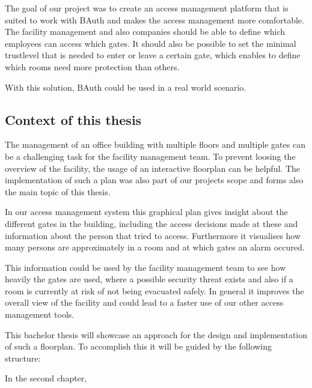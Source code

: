 
The goal of our project was to create an access management platform that is suited to work with BAuth and makes the access management more comfortable. The facility management and also companies should be able to define which employees can access which gates. It should also be possible to set the minimal trustlevel that is needed to enter or leave a certain gate, which enables to define which rooms need more protection than others.

With this solution, BAuth could be used in a real world scenario.

\subsection{Context of this thesis}
\label{Context of this thesis}


The management of an office building with multiple floors and multiple gates can be a challenging task for the facility management team. To prevent loosing the overview of the facility, the usage of an interactive floorplan can be helpful. The implementation of such a plan was also part of our projects scope and forms also the main topic of this thesis.

In our access management system this graphical plan gives insight about the different gates in the building, including the access decisions made at these and information about the person that tried to access. Furthermore it visualises how many persons are approximately in a room and at which gates an alarm occured. 

This information could be used by the facility management team to see how heavily the gates are used, where a possible security threat exists and also if a room is currently at risk of not being evacuated safely. 
In general it improves the overall view of the facility and could lead to a faster use of our other access management tools.

This bachelor thesis will showcase an approach for the design and implementation of such a floorplan. To accomplish this it will be guided by the following structure:

In the second chapter, 

